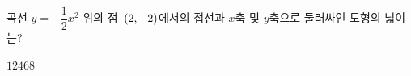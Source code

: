 곡선 $y=-\dfrac{1}{2}x^2$ 위의 점~$(2{,}\mkern3mu\mathopen{}-2)$에서의 접선과 $x$축 및 $y$축으로 둘러싸인 도형의 넓이는?
\begin{choices32}{$1$}{$2$}{$4$}{$6$}{$8$}\end{choices32}
